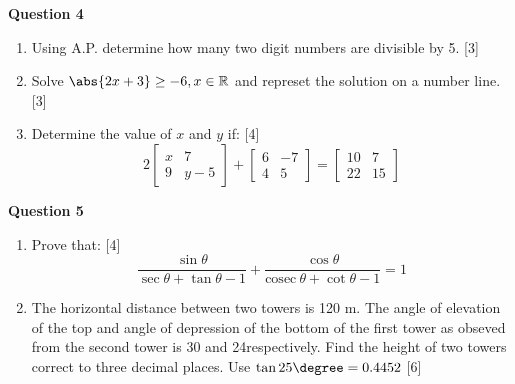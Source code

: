 \noindent
\textbf{Question 4}
\begin{enumerate}[label=(\roman*)]

    \item Using A.P. determine how many two digit numbers are divisible by 5. \hfill [3]

\item Solve $\abs{ 2x + 3 } \geq -6, x \in \mathbb{R}$ and represet 
    the solution on a number line. \hfill [3]

    \item Determine the value of $x$ and $y$ if: \hfill [4]
        \[
            2 \begin{bmatrix*}  x &  7 \\  9 & y-5 \end{bmatrix*} + 
              \begin{bmatrix*}  6 & -7 \\  4 &   5 \end{bmatrix*} =
              \begin{bmatrix*} 10 &  7 \\ 22 &  15 \end{bmatrix*}
        \]

\end{enumerate}

\newpage
\noindent
\textbf{Question 5}
\begin{enumerate}[label=(\roman*)]

    \item Prove that: \hfill [4]
        \[
            \frac{\sin \theta}{\sec \theta + \tan \theta - 1} + 
            \frac{\cos \theta}{\mathrm{cosec} \ \theta + \cot \theta -1 } = 1
        \]

    \item The horizontal distance between two towers is 120 m. The angle 
        of elevation of the top and angle of depression of the bottom 
        of the first tower as obseved from the second tower is 30\degree 
        and 24\degree respectively. Find the height of two towers correct 
        to three decimal places. Use $\tan 25\degree = 0.4452$ \hfill [6]

\end{enumerate}


